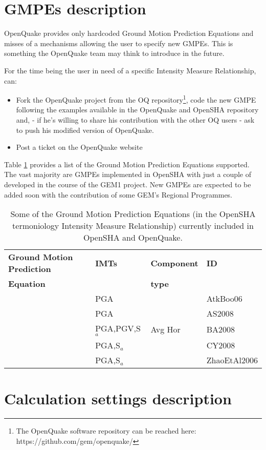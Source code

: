 \section{GMPEs description}
\label{hazard:gmpe_selection}
OpenQuake provides only hardcoded Ground Motion Prediction Equations and misses of a mechanisms allowing the user to specify new GMPEs. This is something the OpenQuake team may think to introduce in the future. 

For the time being the user in need of a specific Intensity Measure Relationship, can:
\begin{itemize}
\item Fork the OpenQuake project from the OQ repository\footnote{ The OpenQuake software repository can be reached here: \hfill \newline  https://github.com/gem/openquake/}, code the new GMPE following the examples available in the OpenQuake and OpenSHA repository and, - if he's willing to share his contribution with the other OQ users - ask to push his modified version of OpenQuake. 
\item Post a ticket on the OpenQuake website  
\end{itemize}

Table \ref{tab:OQ_GMPEs} provides a list of the Ground Motion Prediction Equations supported. The vast majority are GMPEs implemented in OpenSHA with just a couple of developed in the course of the GEM1 project. New GMPEs are expected to be added soon with the contribution of some GEM's Regional Programmes.
%
\begin{table}[!t]
\centering
\begin{tabular}{llll} \hline
\textbf{Ground Motion Prediction} & \textbf{IMTs} & \textbf{Component } & \textbf{ID} \\
\textbf{Equation}& & \textbf{type} & \\ 
\hline
\cite{atkinson2006} & PGA & & AtkBoo06 \\
\cite{abrahamson2008} & PGA & & AS2008 \\
\cite{boore2008}  & PGA,PGV,S$_{a}$ & Avg Hor & BA2008 \\
\cite{chiou2008}  & PGA,S$_{a}$ &  & CY2008 \\
\cite{zhao2006}  & PGA,S$_{a}$ &  & ZhaoEtAl2006 \\
\hline
\end{tabular}
\caption{Some of the Ground Motion Prediction Equations (in the OpenSHA termoniology Intensity Measure Relationship) currently included in OpenSHA and OpenQuake.}
\label{tab:OQ_GMPEs}
\end{table}
%
%
\section{Calculation settings description}
\label{hazard:calculation_settings}
%



